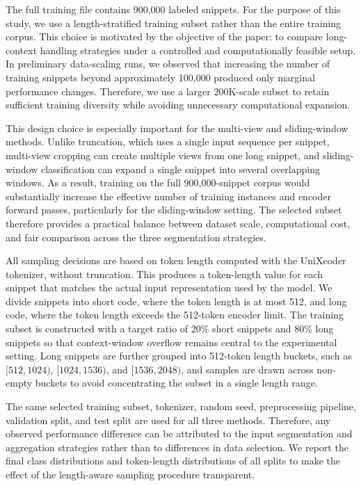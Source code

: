 \documentclass[conference]{IEEEtran}
\begin{document}
The full training file contains 900,000 labeled snippets. For the purpose of this study, we use a length-stratified training subset rather than the entire training corpus. This choice is motivated by the objective of the paper: to compare long-context handling strategies under a controlled and computationally feasible setup. In preliminary data-scaling runs, we observed that increasing the number of training snippets beyond approximately 100,000 produced only marginal performance changes. Therefore, we use a larger 200K-scale subset to retain sufficient training diversity while avoiding unnecessary computational expansion.

This design choice is especially important for the multi-view and sliding-window methods. Unlike truncation, which uses a single input sequence per snippet, multi-view cropping can create multiple views from one long snippet, and sliding-window classification can expand a single snippet into several overlapping windows. As a result, training on the full 900,000-snippet corpus would substantially increase the effective number of training instances and encoder forward passes, particularly for the sliding-window setting. The selected subset therefore provides a practical balance between dataset scale, computational cost, and fair comparison across the three segmentation strategies.

All sampling decisions are based on token length computed with the UniXcoder tokenizer, without truncation. This produces a token-length value for each snippet that matches the actual input representation used by the model. We divide snippets into short code, where the token length is at most 512, and long code, where the token length exceeds the 512-token encoder limit. The training subset is constructed with a target ratio of 20\% short snippets and 80\% long snippets so that context-window overflow remains central to the experimental setting. Long snippets are further grouped into 512-token length buckets, such as $[512,1024)$, $[1024,1536)$, and $[1536,2048)$, and samples are drawn across non-empty buckets to avoid concentrating the subset in a single length range.

The same selected training subset, tokenizer, random seed, preprocessing pipeline, validation split, and test split are used for all three methods. Therefore, any observed performance difference can be attributed to the input segmentation and aggregation strategies rather than to differences in data selection. We report the final class distributions and token-length distributions of all splits to make the effect of the length-aware sampling procedure transparent.
\end{document}
